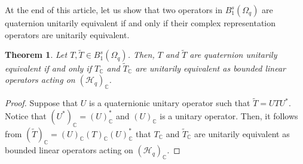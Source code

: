 \documentclass[pdflatex,sn-mathphys-num]{sn-jnl}%
\theoremstyle{thmstyleone}%
\newtheorem{theorem}{Theorem}%
\theoremstyle{thmstyletwo}%
\theoremstyle{thmstylethree}%
\newtheorem{theorem}{Theorem}[section]
\theoremstyle{definition}
\theoremstyle{remark}
\begin{document}
At the end of this article, let us show that two operators in $B_1^{s}(\Omega_{q})$ are quaternion unitarily equivalent if and only if their complex representation operators are unitarily equivalent.

\begin{theorem}
Let $T,\widetilde{T}\in B_1^{s}(\Omega_{q})$. Then,
$T$ and $\widetilde{T}$ are quaternion unitarily equivalent if and only if
$T_{\mathbb{C}}$ and $\widetilde{T}_{\mathbb{C}}$ are unitarily equivalent as bounded linear operators acting on $({\mathcal{H}_q})_\mathbb{C}$.
\end{theorem}

    \begin{proof}
    Suppose that $U$ is a quaternionic unitary operator such that
    $\widetilde{T}=UTU^*$. Notice that $(U^*)_{\mathbb{C}}=(U)_{\mathbb{C}}^*$ and $(U)_{\mathbb{C}}$ is a unitary operator. Then, it follows from $(\widetilde{T})_{\mathbb{C}}=(U)_{\mathbb{C}}(T)_{\mathbb{C}}(U)_{\mathbb{C}}^*$  that $T_{\mathbb{C}}$ and $\widetilde{T}_{\mathbb{C}}$ are unitarily equivalent as bounded linear operators acting on $({\mathcal{H}_q})_\mathbb{C}$.



\end{proof}
\end{document}
